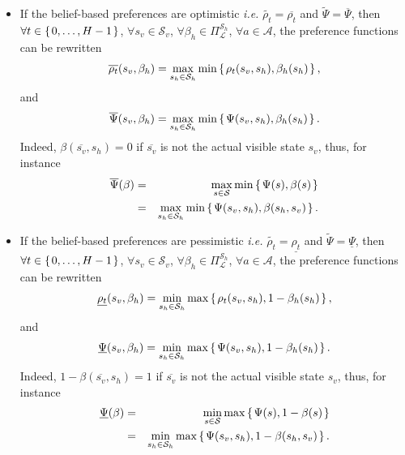 \begin{itemize}
\item If the belief-based preferences are optimistic \textit{i.e.}
$\tilde{\rho_t}=\overline{\rho_t}$ and $\tilde{\Psi}=\overline{\Psi}$,
then $\forall t \in \left\{ \left.  0, \ldots, H-1  \right. \right\}$, $\forall s_v \in \mathcal{S}_v$,
$\forall \beta_h \in \Pi^{\mathcal{S}_h}_{\mathcal{L}}$, $\forall a \in \mathcal{A}$,  
the preference functions can be rewritten
\[ \overline{\rho_t}(s_v,\beta_h) = \max_{s_h \in \mathcal{S}_h} \min \left\{ \left.  \rho_t(s_v,s_h), \beta_h(s_h)  \right. \right\}, \]
and
\[ \overline{\Psi}(s_v,\beta_h) = \max_{s_h \in \mathcal{S}_h} \min \left\{ \left.  \Psi(s_v,s_h), \beta_h(s_h)  \right. \right\}. \]
Indeed, $\beta(\overline{s_v},s_h) = 0$ 
if $\overline{s_v}$ is not the 
actual visible state $s_v$, 
thus, for instance
\begin{eqnarray*}
\overline{\Psi}(\beta) & = & \max_{s \in \mathcal{S}} \min \left\{ \left.  \Psi(s), \beta(s) \right. \right\} \\
 & = & \max_{s_h \in \mathcal{S}_h} \min \left\{ \left.  \Psi(s_v,s_h), \beta(s_h,s_v) \right. \right\}.
\end{eqnarray*} 
\item If the belief-based preferences are pessimistic \textit{i.e.}
$\tilde{\rho_t}=\underline{\rho_t}$ and $\tilde{\Psi}=\underline{\Psi}$,
then $\forall t \in \left\{ \left.  0, \ldots, H-1  \right. \right\}$, $\forall s_v \in \mathcal{S}_v$,
$\forall \beta_h \in \Pi^{\mathcal{S}_h}_{\mathcal{L}}$, $\forall a \in \mathcal{A}$,  
the preference functions can be rewritten
\[ \underline{\rho_t}(s_v,\beta_h) = \min_{s_h \in \mathcal{S}_h} \max \left\{ \left.  \rho_t(s_v,s_h), 1 - \beta_h(s_h)  \right. \right\}, \]
and
\[ \underline{\Psi}(s_v,\beta_h) = \min_{s_h \in \mathcal{S}_h} \max \left\{ \left.  \Psi(s_v,s_h), 1 - \beta_h(s_h)  \right. \right\}. \]
Indeed, $1 - \beta(\overline{s_v},s_h) = 1$ 
if $\overline{s_v}$ is not the 
actual visible state $s_v$, 
thus, for instance
\begin{eqnarray*}
\underline{\Psi}(\beta) & = & \min_{s \in \mathcal{S}} \max \left\{ \left.  \Psi(s), 1 - \beta(s) \right. \right\} \\
 & = & \min_{s_h \in \mathcal{S}_h} \max \left\{ \left.  \Psi(s_v,s_h), 1 - \beta(s_h,s_v) \right. \right\}.
\end{eqnarray*} 
\end{itemize}

